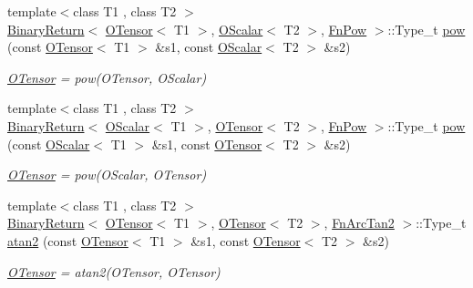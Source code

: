 \begin{DoxyCompactItemize}
{\footnotesize template$<$class T1 , class T2 $>$ }\\\mbox{\hyperlink{structENSEM_1_1BinaryReturn}{Binary\+Return}}$<$ \mbox{\hyperlink{classENSEM_1_1OTensor}{O\+Tensor}}$<$ T1 $>$, \mbox{\hyperlink{classENSEM_1_1OScalar}{O\+Scalar}}$<$ T2 $>$, \mbox{\hyperlink{structENSEM_1_1FnPow}{Fn\+Pow}} $>$\+::Type\+\_\+t \mbox{\hyperlink{group__obstensor_ga5d6fdaa96c08e10d2006c495cb0af217}{pow}} (const \mbox{\hyperlink{classENSEM_1_1OTensor}{O\+Tensor}}$<$ T1 $>$ \&s1, const \mbox{\hyperlink{classENSEM_1_1OScalar}{O\+Scalar}}$<$ T2 $>$ \&s2)
\begin{DoxyCompactList}\small\item\em \mbox{\hyperlink{classENSEM_1_1OTensor}{O\+Tensor}} = pow(\+O\+Tensor, O\+Scalar) \end{DoxyCompactList}\item 
{\footnotesize template$<$class T1 , class T2 $>$ }\\\mbox{\hyperlink{structENSEM_1_1BinaryReturn}{Binary\+Return}}$<$ \mbox{\hyperlink{classENSEM_1_1OScalar}{O\+Scalar}}$<$ T1 $>$, \mbox{\hyperlink{classENSEM_1_1OTensor}{O\+Tensor}}$<$ T2 $>$, \mbox{\hyperlink{structENSEM_1_1FnPow}{Fn\+Pow}} $>$\+::Type\+\_\+t \mbox{\hyperlink{group__obstensor_ga5f02683bb668851c7df8a84ba438b0fb}{pow}} (const \mbox{\hyperlink{classENSEM_1_1OScalar}{O\+Scalar}}$<$ T1 $>$ \&s1, const \mbox{\hyperlink{classENSEM_1_1OTensor}{O\+Tensor}}$<$ T2 $>$ \&s2)
\begin{DoxyCompactList}\small\item\em \mbox{\hyperlink{classENSEM_1_1OTensor}{O\+Tensor}} = pow(\+O\+Scalar, O\+Tensor) \end{DoxyCompactList}\item 
{\footnotesize template$<$class T1 , class T2 $>$ }\\\mbox{\hyperlink{structENSEM_1_1BinaryReturn}{Binary\+Return}}$<$ \mbox{\hyperlink{classENSEM_1_1OTensor}{O\+Tensor}}$<$ T1 $>$, \mbox{\hyperlink{classENSEM_1_1OTensor}{O\+Tensor}}$<$ T2 $>$, \mbox{\hyperlink{structENSEM_1_1FnArcTan2}{Fn\+Arc\+Tan2}} $>$\+::Type\+\_\+t \mbox{\hyperlink{group__obstensor_ga167556ae7bebc48d05e83003206f36dd}{atan2}} (const \mbox{\hyperlink{classENSEM_1_1OTensor}{O\+Tensor}}$<$ T1 $>$ \&s1, const \mbox{\hyperlink{classENSEM_1_1OTensor}{O\+Tensor}}$<$ T2 $>$ \&s2)
\begin{DoxyCompactList}\small\item\em \mbox{\hyperlink{classENSEM_1_1OTensor}{O\+Tensor}} = atan2(\+O\+Tensor, O\+Tensor) \end{DoxyCompactList}\item 

\end{DoxyCompactItemize}
